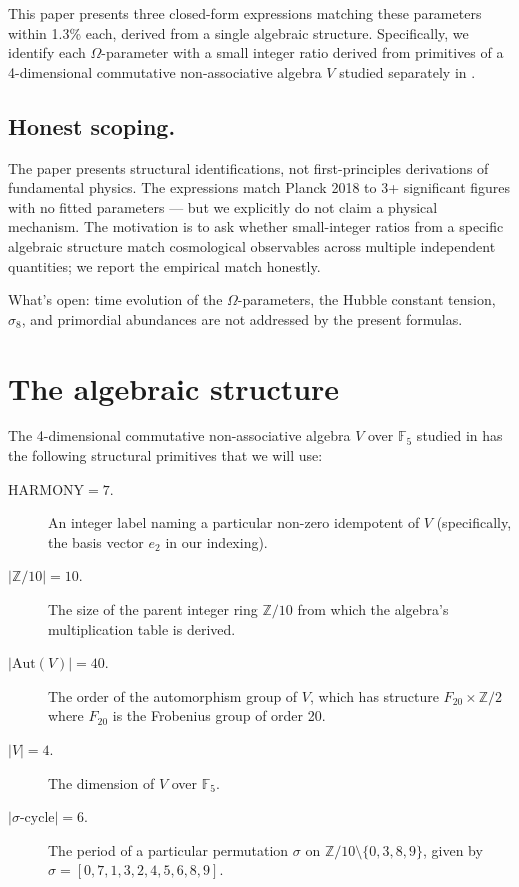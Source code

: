 \documentclass[11pt,reqno]{amsart}
\theoremstyle{plain}
\theoremstyle{definition}
\theoremstyle{remark}
\newcommand{\Z}{\mathbb{Z}}
\newcommand{\F}{\mathbb{F}}
\newcommand{\Aut}{\mathrm{Aut}}
\begin{document}
This paper presents three closed-form expressions matching these
parameters within 1.3\% each, derived from a single algebraic structure.
Specifically, we identify each $\Omega$-parameter with a small integer
ratio derived from primitives of a 4-dimensional commutative
non-associative algebra $V$ studied separately in
\cite{Sanders2026Dirac}.

\subsection{Honest scoping.}
The paper presents structural identifications, not first-principles
derivations of fundamental physics. The expressions match Planck 2018 to
3+ significant figures with no fitted parameters --- but we explicitly
do not claim a physical mechanism. The motivation is to ask whether
small-integer ratios from a specific algebraic structure match
cosmological observables across multiple independent quantities; we
report the empirical match honestly.

What's open: time evolution of the $\Omega$-parameters, the Hubble
constant tension, $\sigma_8$, and primordial abundances are not
addressed by the present formulas.

\section{The algebraic structure}

The 4-dimensional commutative non-associative algebra $V$ over $\F_5$
studied in \cite{Sanders2026Dirac} has the following structural
primitives that we will use:

\begin{description}
\item[$\mathrm{HARMONY} = 7$.] An integer label naming a particular
non-zero idempotent of $V$ (specifically, the basis vector $e_2$ in our
indexing).
\item[$|\Z/10| = 10$.] The size of the parent integer ring $\Z/10$ from
which the algebra's multiplication table is derived.
\item[$|\Aut(V)| = 40$.] The order of the automorphism group of $V$,
which has structure $F_{20} \times \Z/2$ where $F_{20}$ is the Frobenius
group of order 20.
\item[$|V| = 4$.] The dimension of $V$ over $\F_5$.
\item[$|\sigma\text{-cycle}| = 6$.] The period of a particular
permutation $\sigma$ on $\Z/10 \setminus \{0, 3, 8, 9\}$, given by
$\sigma = [0, 7, 1, 3, 2, 4, 5, 6, 8, 9]$.
\end{description}
\end{document}
